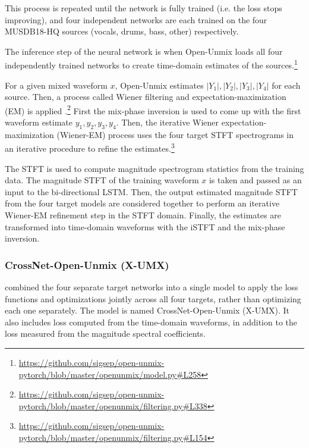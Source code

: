 \documentclass[report.tex]{subfiles}
\begin{document}
\begin{tight_enumerate}
	\item
		This process is repeated until the network is fully trained (i.e. the loss stops improving), and four independent networks are each trained on the four MUSDB18-HQ sources (vocals, drums, bass, other) respectively.
	\item
		The inference step of the neural network is when Open-Unmix loads all four independently trained networks to create time-domain estimates of the sources.\footnote{\url{https://github.com/sigsep/open-unmix-pytorch/blob/master/openunmix/model.py\#L258}}
	\item
		For a given mixed waveform $x$, Open-Unmix estimates $|Y_{1}|, |Y_{2}|, |Y_{3}|, |Y_{4}|$ for each source. Then, a process called Wiener filtering and expectation-maximization (EM) is applied \parencite{umxorig1, wiener2, wiener3, wiener4}.\footnote{\url{https://github.com/sigsep/open-unmix-pytorch/blob/master/openunmix/filtering.py\#L338}} First the mix-phase inversion is used to come up with the first waveform estimate $y_{1}, y_{2}, y_{3}, y_{4}$. Then, the iterative Wiener expectation-maximization (Wiener-EM) process uses the four target STFT spectrograms in an iterative procedure to refine the estimates.\footnote{\url{https://github.com/sigsep/open-unmix-pytorch/blob/master/openunmix/filtering.py\#L154}}
\end{tight_enumerate}

The STFT is used to compute magnitude spectrogram statistics from the training data. The magnitude STFT of the training waveform $x$ is taken and passed as an input to the bi-directional LSTM. Then, the output estimated magnitude STFT from the four target models are considered together to perform an iterative Wiener-EM refinement step in the STFT domain. Finally, the estimates are transformed into time-domain waveforms with the iSTFT and the mix-phase inversion.

\subsubsection{CrossNet-Open-Unmix (X-UMX)}
\label{sec:xumx}

\textcite{xumx} combined the four separate target networks into a single model to apply the loss functions and optimizations jointly across all four targets, rather than optimizing each one separately. The model is named CrossNet-Open-Unmix (X-UMX). It also includes loss computed from the time-domain waveforms, in addition to the loss measured from the magnitude spectral coefficients.
\end{document}

